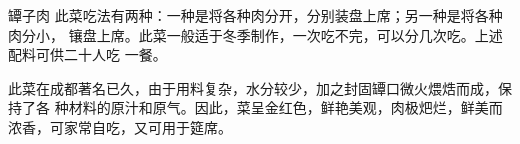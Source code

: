 \begin{recipe}{罈子肉}
\step 此菜吃法有两种：一种是将各种肉分开，分别装盘上席；另一种是将各种肉分小，
镶盘上席。此菜一般适于冬季制作，一次吃不完，可以分几次吃。上述配料可供二十人吃
一餐。

\features

此菜在成都著名已久，由于用料复杂，水分较少，加之封固罈口微火煨焅而成，保持了各
种材料的原汁和原气。因此，菜呈金红色，鲜艳美观，肉极𤆵\footnotemark 烂，鲜美而
浓香，可家常自吃，又可用于筵席。


\end{recipe}

